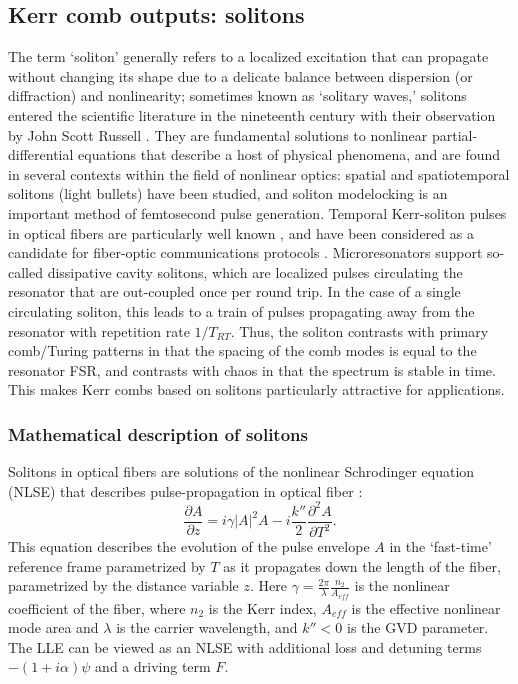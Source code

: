 \subsection{Kerr comb outputs: solitons} \label{sec:LLEsolitons}
The term `soliton' generally refers to a localized excitation that can propagate without changing its shape due to a delicate balance between dispersion (or diffraction) and nonlinearity; sometimes known as `solitary waves,' solitons entered the scientific literature in the nineteenth century with their observation by John Scott Russell \cite{Russell1844}. They are fundamental solutions to nonlinear partial-differential equations that describe a host of physical phenomena, and are found in several contexts within the field of nonlinear optics: spatial \cite{Lugiato1987,Brambilla1997} and spatiotemporal solitons (light bullets) \cite{Minardi2010} have been studied, and soliton modelocking \cite{Kartner1996,Grelu2012} is an important method of femtosecond pulse generation. Temporal Kerr-soliton pulses in optical fibers are particularly well known \cite{Agrawal2007,Mollenauer2006}, and have been considered as a candidate for fiber-optic communications protocols \cite{Hasegawa1995,Haus1996}. Microresonators support so-called dissipative cavity solitons, which are localized pulses circulating the resonator that are out-coupled once per round trip. In the case of a single circulating soliton, this leads to a train of pulses propagating away from the resonator with repetition rate $1/T_{RT}$. Thus, the soliton contrasts with primary comb/Turing patterns in that the spacing of the comb modes is equal to the resonator FSR, and contrasts with chaos in that the spectrum is stable in time. This makes Kerr combs based on solitons particularly attractive for applications.

\subsubsection{Mathematical description of solitons}
\label{sec:solitonmath}

Solitons in optical fibers are solutions of the nonlinear Schrodinger equation (NLSE) that describes pulse-propagation in optical fiber \cite{Agrawal2007}:
\begin{equation}
\frac{\partial A}{\partial z}= i\gamma|A|^2 A -i \frac{k''}{2} \frac{\partial^2 A}{\partial T^2}. \label{NLSE}
\end{equation}
This equation describes the evolution of the pulse envelope $A$ in the `fast-time' reference frame parametrized by $T$ as it propagates down the length of the fiber, parametrized by the distance variable $z$. Here $\gamma=\frac{2\pi}{\lambda}\frac{n_2}{A_{eff}}$ is the nonlinear coefficient of the fiber, where $n_2$ is the Kerr index, $A_{eff}$ is the effective nonlinear mode area and $\lambda$ is the carrier wavelength, and $k''<0$ is the GVD parameter. The LLE can be viewed as an NLSE with additional loss and detuning terms $-(1+i\alpha)\psi$ and a driving term $F$.

